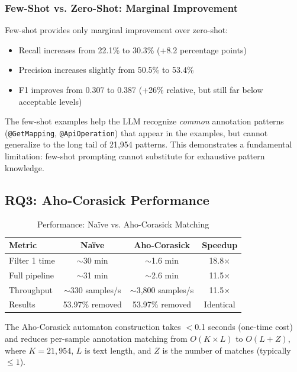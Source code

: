 \documentclass[acmlarge,nonacm,screen]{acmart}
\begin{document}
\subsubsection{Few-Shot vs. Zero-Shot: Marginal Improvement}

Few-shot provides only marginal improvement over zero-shot:
\begin{itemize}
    \item Recall increases from 22.1\% to 30.3\% (+8.2 percentage points)
    \item Precision increases slightly from 50.5\% to 53.4\%
    \item F1 improves from 0.307 to 0.387 (+26\% relative, but still far below acceptable levels)
\end{itemize}

The few-shot examples help the LLM recognize \textit{common} annotation patterns (\texttt{@GetMapping}, \texttt{@ApiOperation}) that appear in the examples, but cannot generalize to the long tail of 21,954 patterns. This demonstrates a fundamental limitation: few-shot prompting cannot substitute for exhaustive pattern knowledge.

\subsection{RQ3: Aho-Corasick Performance}

\begin{table}[htbp]
\caption{Performance: Na\"ive vs. Aho-Corasick Matching}
\label{tab:rq3}
\begin{tabular}{@{}lccc@{}}
\toprule
\textbf{Metric} & \textbf{Na\"ive} & \textbf{Aho-Corasick} & \textbf{Speedup} \\
\midrule
Filter 1 time & $\sim$30 min & $\sim$1.6 min & 18.8$\times$ \\
Full pipeline & $\sim$31 min & $\sim$2.6 min & 11.5$\times$ \\
Throughput & $\sim$330 samples/s & $\sim$3,800 samples/s & 11.5$\times$ \\
Results & 53.97\% removed & 53.97\% removed & Identical \\
\bottomrule
\end{tabular}
\end{table}

The Aho-Corasick automaton construction takes $<$0.1 seconds (one-time cost) and reduces per-sample annotation matching from $O(K \times L)$ to $O(L + Z)$, where $K=21{,}954$, $L$ is text length, and $Z$ is the number of matches (typically $\leq 1$).
\end{document}
